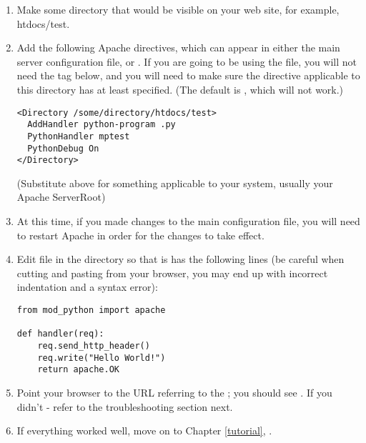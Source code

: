\begin{enumerate}

\item
Make some directory that would be visible on your web site, for
example, htdocs/test.

\item
Add the following Apache directives, which can appear in either the
main server configuration file, or .  If you are going
to be using the  file, you will not need the
 tag below, and you will need to make sure the
 directive applicable to this directory has at least
 specified. (The default is , which will not work.)

\begin{verbatim}
<Directory /some/directory/htdocs/test> 
  AddHandler python-program .py
  PythonHandler mptest 
  PythonDebug On 
</Directory>
\end{verbatim}

(Substitute  above for something applicable to
your system, usually your Apache ServerRoot)

\item
At this time, if you made changes to the main configuration file, you
will need to restart Apache in order for the changes to take effect.

\item
Edit  file in the  directory so
that is has the following lines (be careful when cutting and pasting
from your browser, you may end up with incorrect indentation and a
syntax error):

\begin{verbatim}
from mod_python import apache

def handler(req):
    req.send_http_header()
    req.write("Hello World!")
    return apache.OK 
\end{verbatim}

\item
Point your browser to the URL referring to the ; you
should see . If you didn't - refer to the
troubleshooting section next.

\item
If everything worked well, move on to Chapter \ref{tutorial}, 
. 

\end{enumerate}

